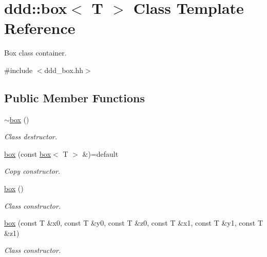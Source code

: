 \hypertarget{classddd_1_1box}{}\section{ddd\+:\+:box$<$ T $>$ Class Template Reference}
\label{classddd_1_1box}


Box class container.  




{\ttfamily \#include $<$ddd\+\_\+box.\+hh$>$}

\subsection*{Public Member Functions}
\begin{DoxyCompactItemize}
\item 
\mbox{\label{classddd_1_1box_acf895c1a62aa6c53c4e9dc9f2b1b1df1}} 
\hyperlink{classddd_1_1box_acf895c1a62aa6c53c4e9dc9f2b1b1df1}{$\sim$box} ()
\begin{DoxyCompactList}\small\item\em Class destructor. \end{DoxyCompactList}\item 
\mbox{\label{classddd_1_1box_ae36d1565ad1e59e45329aa15d879017d}} 
\hyperlink{classddd_1_1box_ae36d1565ad1e59e45329aa15d879017d}{box} (const \hyperlink{classddd_1_1box}{box}$<$ T $>$ \&)=default
\begin{DoxyCompactList}\small\item\em Copy constructor. \end{DoxyCompactList}\item 
\mbox{\label{classddd_1_1box_abe0d38e4c4380bf430a4781c8c0ed8f6}} 
\hyperlink{classddd_1_1box_abe0d38e4c4380bf430a4781c8c0ed8f6}{box} ()
\begin{DoxyCompactList}\small\item\em Class constructor. \end{DoxyCompactList}\item 
\mbox{\label{classddd_1_1box_a5f4d57343779a88663aead8580127175}} 
\hyperlink{classddd_1_1box_a5f4d57343779a88663aead8580127175}{box} (const T \&x0, const T \&y0, const T \&z0, const T \&x1, const T \&y1, const T \&z1)
\begin{DoxyCompactList}\small\item\em Class constructor. \end{DoxyCompactList}\item 

\end{DoxyCompactItemize}
